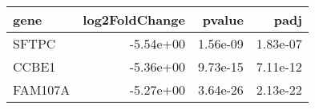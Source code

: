 \begin{tabular}{lrrr}
\toprule
   gene &  log2FoldChange &   pvalue &     padj \\
\midrule
  SFTPC &       -5.54e+00 & 1.56e-09 & 1.83e-07 \\
  CCBE1 &       -5.36e+00 & 9.73e-15 & 7.11e-12 \\
FAM107A &       -5.27e+00 & 3.64e-26 & 2.13e-22 \\
\bottomrule
\end{tabular}
